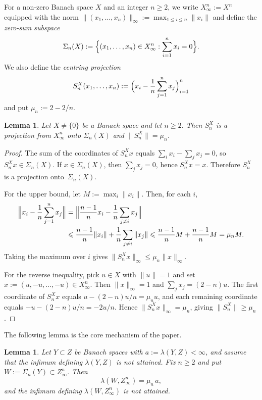 \documentclass[11pt]{amsart}
\renewcommand{\le}{\leqslant}
\renewcommand{\ge}{\geqslant}
\newtheorem{lemma}[theorem]{Lemma}
\theoremstyle{definition}
\theoremstyle{remark}
\theoremstyle{plain}
\numberwithin{equation}{section}
\begin{document}
For a non-zero Banach space $X$ and an integer $n\ge 2$, we write
$X_\infty^n:=X^n$ equipped with the norm
$\|(x_1,\dots,x_n)\|_\infty:=\max_{1\le i\le n}\|x_i\|$
and define the \emph{zero-sum subspace}
\[
\Sigma_n(X):=\Bigl\{(x_1,\dots,x_n)\in X_\infty^n :
\sum_{i=1}^n x_i=0\Bigr\}.
\]
We also define the \emph{centring projection}
\[
S_n^X(x_1,\dots,x_n)
:=\Bigl(x_i-\frac{1}{n}\sum_{j=1}^n x_j\Bigr)_{i=1}^n
\]
and put $\mu_n:=2-2/n$.

\begin{lemma}\label{lem:Sn}
Let $X\neq\{0\}$ be a Banach space and let $n\ge 2$.  Then $S_n^X$ is
a projection from $X_\infty^n$ onto $\Sigma_n(X)$ and
$\|S_n^X\|=\mu_n$.
\end{lemma}

\begin{proof}
The sum of the coordinates of $S_n^Xx$ equals
$\sum_i x_i-\sum_j x_j=0$, so $S_n^Xx\in\Sigma_n(X)$.  If
$x\in\Sigma_n(X)$, then $\sum_j x_j=0$, hence $S_n^Xx=x$.  Therefore
$S_n^X$ is a projection onto~$\Sigma_n(X)$.

For the upper bound, let $M:=\max_i\|x_i\|$.  Then, for each $i$,
\begin{align*}
\Bigl\|x_i-\frac{1}{n}\sum_{j=1}^n x_j\Bigr\|
&=\Bigl\|\frac{n-1}{n}x_i-\frac{1}{n}\sum_{j\ne i}x_j\Bigr\|\\
&\le \frac{n-1}{n}\|x_i\|+\frac{1}{n}\sum_{j\ne i}\|x_j\|
\le \frac{n-1}{n}M+\frac{n-1}{n}M
=\mu_n M.
\end{align*}
Taking the maximum over $i$ gives $\|S_n^Xx\|_\infty\le\mu_n\|x\|_\infty$.

For the reverse inequality, pick $u\in X$ with $\|u\|=1$ and set
$x:=(u,-u,\dots,-u)\in X_\infty^n$.  Then $\|x\|_\infty=1$ and
$\sum_j x_j=(2-n)u$.  The first coordinate of $S_n^Xx$ equals
$u-(2-n)u/n=\mu_n u$, and each remaining coordinate equals
$-u-(2-n)u/n=-2u/n$.  Hence
$\|S_n^Xx\|_\infty=\mu_n$, giving $\|S_n^X\|\ge\mu_n$.
\end{proof}

The following lemma is the core mechanism of the paper.

\begin{lemma}
\label{lem:multiplication}
Let $Y\subset Z$ be Banach spaces with
$a:=\lambda(Y,Z)<\infty$, and assume that the infimum defining $\lambda(Y,Z)$
is not attained.  Fix $n\ge 2$ and put
$W:=\Sigma_n(Y)\subset Z_\infty^n$.  Then
\[
\lambda(W,Z_\infty^n)=\mu_n\,a,
\]
and the infimum defining $\lambda(W,Z_\infty^n)$ is not attained.
\end{lemma}
\end{document}
